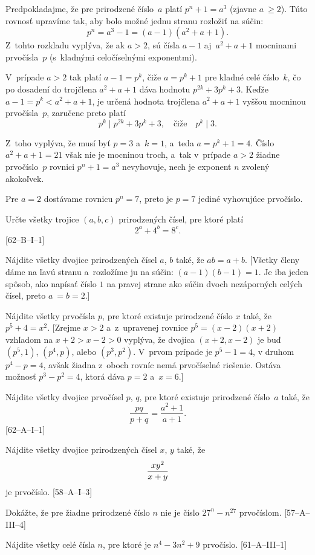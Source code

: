 ﻿{%
Predpokladajme, že pre prirodzené číslo~$a$ platí $p^n+1 = a^3$
(zjavne $a~\ge 2$). Túto rovnosť upravíme tak, aby bolo možné jednu
stranu rozložiť na súčin:
$$
p^n = a^3-1 = (a-1)(a^2+a+1).
$$
Z~tohto rozkladu vyplýva, že ak $a> 2$, sú čísla $a-1$ aj~$a^2+a+1$
mocninami prvočísla~$p$ (s~kladnými celočíselnými exponentmi).

V~prípade $a>2$ tak platí $a-1=p^k$, čiže
$a= p^k+1$ pre kladné celé číslo~$k$, čo po dosadení
do trojčlena $a^2+a+1$ dáva hodnotu $p^{2k}+3p^k+3$. Keďže $a-1=p^k<{a^2+a+1}$,
je určená hodnota trojčlena $a^2+a+1$ vyššou mocninou prvočísla~$p$,
zaručene preto platí
$$
p^{k} \mid p^{2k}+3p^k+3,\quad\text{čiže}\quad p^{k}\mid3.
$$

Z~toho vyplýva, že musí byť $p=3$ a~$k=1$, a~teda $a=p^k+1=4$.
Číslo ${a^2+a+1}=21$ však nie je mocninou troch, a~tak v~prípade $a>2$
žiadne prvočíslo~$p$ rovnici $p^n+1=a^3$ nevyhovuje, nech je exponent $n$ zvolený akokoľvek.

Pre $a= 2$ dostávame rovnicu $p^n = 7$, preto je $p = 7$ jediné vyhovujúce
prvočíslo.


Určte všetky trojice $(a,b,c)$ prirodzených čísel, pre ktoré platí
$$
2^a+4^b=8^c.
$$
[62--B--I--1]

Nájdite všetky dvojice prirodzených čísel $a$, $b$ také, že $ab = a+b$.
[Všetky členy dáme na ľavú stranu a~rozložíme ju na súčin: $(a-1)(b-1)= 1$.
Je iba jeden spôsob, ako napísať číslo $1$ na pravej strane ako súčin
dvoch nezáporných celých čísel, preto $a~= b = 2$.]

Nájdite všetky prvočísla $p$, pre ktoré existuje prirodzené číslo $x$ také,
že $p^5+4 = x^2$.
[Zrejme $x>2$ a~z~upravenej rovnice $p^5=(x-2)(x+2)$
vzhľadom na $x+2>x-2>0$ vyplýva, že dvojica $(x+2,x-2)$ je buď $(p^5,1)$, $(p^4,p)$,
alebo $(p^3,p^2)$. V~prvom prípade je $p^5-1=4$, v druhom $p^4-p=4$, avšak
žiadna z~oboch rovníc nemá prvočíselné riešenie. Ostáva možnosť $p^3-p^2=4$, ktorá dáva $p=2$ a~$x=6$.]

\D
Nájdite všetky dvojice prvočísel $p$, $q$, pre ktoré existuje prirodzené
číslo~$a$ také, že
$$
\frac{pq}{p+q}=\frac{a^2+1}{a+1}.
$$
[62--A--I--1]

Nájdite všetky dvojice prirodzených čísel $x$, $y$ také, že
$$\displaystyle {xy^2\over x+y}$$ je prvočíslo.
[58--A--I--3]

Dokážte, že pre žiadne prirodzené číslo $n$ nie je číslo $27^n - n^{27}$ prvočíslom.
[57--A--III--4]

Nájdite všetky celé čísla $n$, pre ktoré je $n^4-3n^2+9$ prvočíslo.
[61--A--III--1]
}

